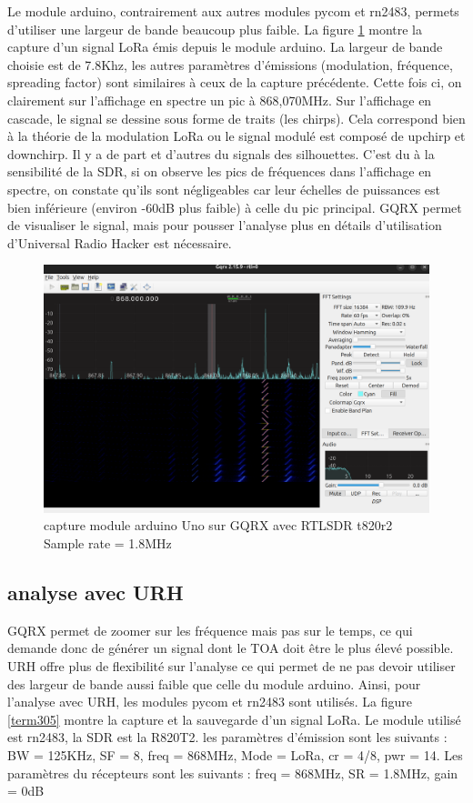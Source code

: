 Le module arduino, contrairement aux autres modules pycom et rn2483, permets d'utiliser une largeur de bande beaucoup plus faible. La figure \ref{term302} montre la capture d'un signal LoRa émis depuis le module arduino. La largeur de bande choisie est de 7.8Khz, les autres paramètres d'émissions (modulation, fréquence, spreading factor) sont similaires à ceux de la capture précédente. Cette fois ci, on clairement sur l'affichage en spectre un pic à 868,070MHz. Sur l'affichage en cascade, le signal se dessine sous forme de traits (les chirps). Cela correspond bien à la théorie de la modulation LoRa ou le signal modulé est composé de upchirp et downchirp. Il y a de part et d'autres du signals des silhouettes. C'est du à la sensibilité de la SDR, si on observe les pics de fréquences dans l'affichage en spectre, on constate qu'ils sont négligeables car leur échelles de puissances est bien inférieure (environ -60dB plus faible) à celle du pic principal. GQRX permet de visualiser le signal, mais pour pousser l'analyse plus en détails d'utilisation d'Universal Radio Hacker est nécessaire.

\begin{figure}[h]
\centering

\includegraphics[scale=0.18]{images/gqrx5.png}
\caption{capture module arduino Uno sur GQRX avec RTLSDR t820r2 Sample rate = 1.8MHz}\label{term302}
\end{figure}

\subsection{analyse avec URH}\label{urh}

GQRX permet de zoomer sur les fréquence mais pas sur le temps, ce qui demande donc de générer un signal dont le TOA doit être le plus élevé possible. URH offre plus de flexibilité sur l'analyse ce qui permet de ne pas devoir utiliser des largeur de bande aussi faible que celle du module arduino. Ainsi, pour l'analyse avec URH, les modules pycom et rn2483 sont utilisés. La figure \ref{term305} montre la capture et la sauvegarde d'un signal LoRa. Le module utilisé est rn2483, la SDR est la R820T2. les paramètres d'émission sont les suivants : BW = 125KHz, SF = 8, freq = 868MHz, Mode = LoRa, cr = 4/8, pwr = 14. Les paramètres du récepteurs sont les suivants : freq = 868MHz, SR = 1.8MHz, gain = 0dB

